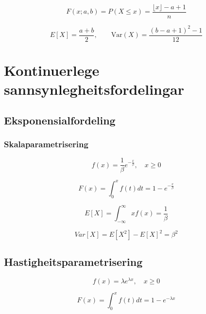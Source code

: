 \begin{equation}
    F(x; a, b) = P(X \leq x) = \frac{\lfloor x \rfloor - a + 1}{n}
\end{equation}

\begin{equation}
    E[X] = \frac{a + b}{2}, \qquad \text{Var}(X) = \frac{(b - a + 1)^2 - 1}{12}
\end{equation}

\section{Kontinuerlege sannsynlegheitsfordelingar}

\subsection{Eksponensialfordeling}\label{eksp}

\subsubsection{Skalaparametrisering}
\begin{equation}
    f(x) = \frac{1}{\beta} e^{-\frac{x}{\beta}},  \quad  x \geq 0
\end{equation}

\begin{equation}
    F(x) = \int_{0}^x f(t) dt = 1 - e^{-\frac{x}{\beta}}
\end{equation}

\begin{equation}
    E[X] = \int_{-\infty}^{\infty} xf(x) = \frac{1}{\beta}
\end{equation}

\begin{equation}
    Var[X] = E[X^2] - E[X]^2 = \beta^2
\end{equation}

\subsection{Hastigheitsparametrisering}

\begin{equation}
    f(x) = \lambda e^{\lambda x},  \quad  x \geq 0
\end{equation}

\begin{equation}
    F(x) = \int_{0}^x f(t) dt = 1 - e^{- \lambda x}
\end{equation}

